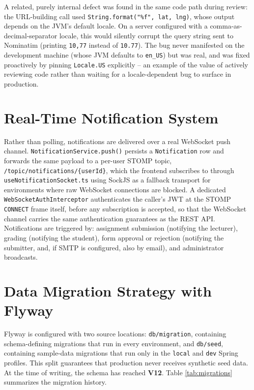 \documentclass[12pt,a4paper]{report}
\begin{document}
A related, purely internal defect was found in the same code path
during review: the URL-building call used
\texttt{String.format("\%f", lat, lng)}, whose output depends on the
JVM's default locale. On a server configured with a
comma-as-decimal-separator locale, this would silently corrupt the
query string sent to Nominatim (printing \texttt{10,77} instead of
\texttt{10.77}). The bug never manifested on the development machine
(whose JVM defaults to \texttt{en\_US}) but was real, and was fixed
proactively by pinning \texttt{Locale.US} explicitly -- an example of
the value of actively reviewing code rather than waiting for a
locale-dependent bug to surface in production.

\section{Real-Time Notification System}

Rather than polling, notifications are delivered over a real WebSocket
push channel. \texttt{NotificationService.push()} persists a
\texttt{Notification} row and forwards the same payload to a
per-user STOMP topic, \texttt{/topic/notifications/\{userId\}}, which
the frontend subscribes to through \texttt{useNotificationSocket.ts}
using SockJS as a fallback transport for environments where raw
WebSocket connections are blocked. A dedicated
\texttt{WebSocketAuthInterceptor} authenticates the caller's JWT at the
STOMP \texttt{CONNECT} frame itself, before any subscription is
accepted, so that the WebSocket channel carries the same authentication
guarantees as the REST API. Notifications are triggered by: assignment
submission (notifying the lecturer), grading (notifying the student),
form approval or rejection (notifying the submitter, and, if SMTP is
configured, also by email), and administrator broadcasts.

\section{Data Migration Strategy with Flyway}

Flyway is configured with two source locations: \texttt{db/migration},
containing schema-defining migrations that run in every environment,
and \texttt{db/seed}, containing sample-data migrations that run only
in the \texttt{local} and \texttt{dev} Spring profiles. This split
guarantees that production never receives synthetic seed data. At the
time of writing, the schema has reached \textbf{V12}. Table
\ref{tab:migrations} summarizes the migration history.
\end{document}
